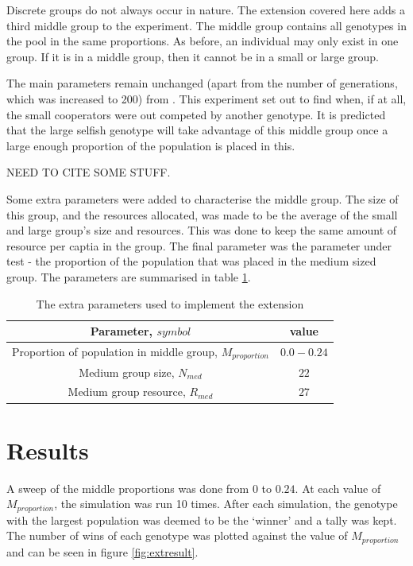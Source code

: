 \documentclass[11pt]{ecsarticle}
\begin{document}
Discrete groups do not always occur in nature.
The extension covered here adds a third middle group to the experiment. 
The middle group contains all genotypes in the pool in the same proportions.
As before, an individual may only exist in one group. 
If it is in a middle group, then it cannot be in a small or large group.

The main parameters remain unchanged (apart from the number of generations, which was increased to 200) from \cite{powers2007individual}.
This experiment set out to find when, if at all, the small cooperators were out competed by another genotype.
It is predicted that the large selfish genotype will take advantage of this middle group once a large enough proportion of the population is placed in this.

NEED TO CITE SOME STUFF.




Some extra parameters were added to characterise the middle group. 
The size of this group, and the resources allocated, was made to be the average of the small and large group's size and resources. 
This was done to keep the same amount of resource per captia in the group.
The final parameter was the parameter under test - the proportion of the population that was placed in the medium sized group.
The parameters are summarised in table \ref{table:extparams}. 

\begin{table}
 \caption{The extra parameters used to implement the extension}
 \label{table:extparams}
 \begin{tabular}{|c|c|}
  Parameter, $symbol$ & value \\ \hline 
  Proportion of population in middle group, $M_{proportion}$ & $0.0 - 0.24$ \\ 
  Medium group size, $N_{med}$ & $22$ \\
  Medium group resource, $R_{med}$ & $27$ \\ \hline
 \end{tabular}
\end{table}


\section{Results}\label{sc:results}

A sweep of the middle proportions was done from $0$ to $0.24$. 
At each value of $M_{proportion}$, the simulation was run 10 times.
After each simulation, the genotype with the largest population was deemed to be the `winner' and a tally was kept. 
The number of wins of each genotype was plotted against the value of $M_{proportion}$ and can be seen in figure \ref{fig:extresult}.
\end{document}
